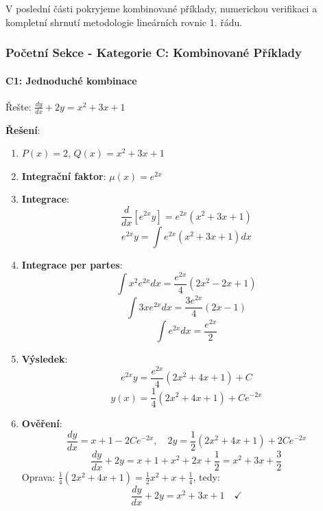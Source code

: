 \begin{transition}
V poslední části pokryjeme kombinované příklady, numerickou verifikaci a kompletní shrnutí metodologie lineárních rovnic 1. řádu.
\end{transition}


\subsubsection{Početní Sekce - Kategorie C: Kombinované Příklady}
\label{subsubsec:pocetni-kategorie-c-linear}

\paragraph*{C1: Jednoduché kombinace}

\begin{example}
Řešte: $\frac{dy}{dx} + 2y = x^2 + 3x + 1$
\vspace{0.3\baselineskip}

\textbf{Řešení}: 
\begin{enumerate}
\item $P(x) = 2$, $Q(x) = x^2 + 3x + 1$

\item \textbf{Integrační faktor}: $\mu(x) = e^{2x}$

\item \textbf{Integrace}:
\[
\frac{d}{dx}[e^{2x}y] = e^{2x}(x^2 + 3x + 1)
\]
\[
e^{2x}y = \int e^{2x}(x^2 + 3x + 1)dx
\]

\item \textbf{Integrace per partes}:
\[
\int x^2 e^{2x}dx = \frac{e^{2x}}{4}(2x^2 - 2x + 1)
\]
\[
\int 3x e^{2x}dx = \frac{3e^{2x}}{4}(2x - 1)
\]
\[
\int e^{2x}dx = \frac{e^{2x}}{2}
\]

\item \textbf{Výsledek}:
\[
e^{2x}y = \frac{e^{2x}}{4}(2x^2 + 4x + 1) + C
\]
\[
y(x) = \frac{1}{4}(2x^2 + 4x + 1) + Ce^{-2x}
\]

\item \textbf{Ověření}:
\[
\frac{dy}{dx} = x + 1 - 2Ce^{-2x}, \quad 2y = \frac{1}{2}(2x^2 + 4x + 1) + 2Ce^{-2x}
\]
\[
\frac{dy}{dx} + 2y = x + 1 + x^2 + 2x + \frac{1}{2} = x^2 + 3x + \frac{3}{2}
\]
Oprava: $\frac{1}{4}(2x^2 + 4x + 1) = \frac{1}{2}x^2 + x + \frac{1}{4}$, tedy:
\[
\frac{dy}{dx} + 2y = x^2 + 3x + 1 \quad \checkmark
\]
\end{enumerate}
\end{example}

